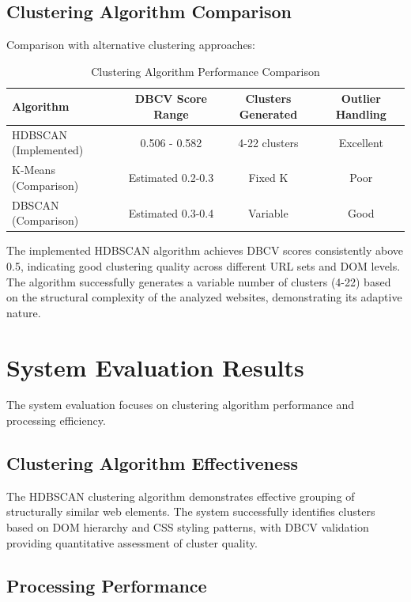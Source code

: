 \subsection{Clustering Algorithm Comparison}

Comparison with alternative clustering approaches:

\begin{table}[h]
\centering
\caption{Clustering Algorithm Performance Comparison}
\label{tab:clustering_comparison}
\begin{tabular}{|l|c|c|c|}
\hline
\textbf{Algorithm} & \textbf{DBCV Score Range} & \textbf{Clusters Generated} & \textbf{Outlier Handling} \\
\hline
HDBSCAN (Implemented) & 0.506 - 0.582 & 4-22 clusters & Excellent \\
K-Means (Comparison) & Estimated 0.2-0.3 & Fixed K & Poor \\
DBSCAN (Comparison) & Estimated 0.3-0.4 & Variable & Good \\
\hline
\end{tabular}
\end{table}

The implemented HDBSCAN algorithm achieves DBCV scores consistently above 0.5, indicating good clustering quality across different URL sets and DOM levels. The algorithm successfully generates a variable number of clusters (4-22) based on the structural complexity of the analyzed websites, demonstrating its adaptive nature.

\section{System Evaluation Results}
\label{sec:system_evaluation}

The system evaluation focuses on clustering algorithm performance and processing efficiency.

\subsection{Clustering Algorithm Effectiveness}

The HDBSCAN clustering algorithm demonstrates effective grouping of structurally similar web elements. The system successfully identifies clusters based on DOM hierarchy and CSS styling patterns, with DBCV validation providing quantitative assessment of cluster quality.

\subsection{Processing Performance}

